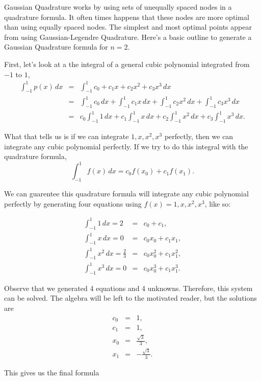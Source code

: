 \documentclass[12pt]{article}
\newcommand{\newLine}{\vspace{5mm}}
\newcommand{\integral}[3]{\text{$\int^{#2}_{#1} #3\,dx$}}
\begin{document}
\newLine Gaussian Quadrature works by using sets of unequally spaced nodes in a quadrature formula. It often times happens that these nodes are more optimal than using equally spaced nodes. The simplest and most optimal points appear from using Gaussian-Legendre Quadrature. Here's a basic outline to generate a Gaussian Quadrature formula for $n=2$.

First, let's look at a the integral of a general cubic polynomial integrated from $-1$ to $1$,
\begin{eqnarray*} \integral{-1}{1}{p(x)} &=& \integral{-1}{1}{c_0 + c_1x + c_2x^2 + c_3x^3} \\
&=& \integral{-1}{1}{c_0} + \integral{-1}{1}{c_1x} + \integral{-1}{1}{c_2x^2} + \integral{-1}{1}{c_3x^3} \\
&=& c_0\integral{-1}{1}{1} + c_1\integral{-1}{1}{x} + c_2\integral{-1}{1}{x^2} + c_3\integral{-1}{1}{x^3}.
\end{eqnarray*}

What that tells us is if we can integrate $1,x,x^2,x^3$ perfectly, then we can integrate any cubic polynomial perfectly. If we try to do this integral with the quadrature formula,
\begin{equation*} \integral{-1}{1}{f(x)} = c_0f(x_0) + c_1f(x_1). \end{equation*}

We can guarentee this quadrature formula will integrate any cubic polynomial perfectly by generating four equations using $f(x)=1,x,x^2,x^3$, like so:

\begin{eqnarray*} \integral{-1}{1}{1} = 2 &=& c_0 + c_1, \\
\integral{-1}{1}{x} = 0 &=& c_0x_0 + c_1x_1, \\
\integral{-1}{1}{x^2} = \frac{2}{3} &=& c_0x_0^2 + c_1x_1^2, \\
\integral{-1}{1}{x^3} = 0 &=& c_0x_0^3 + c_1x_1^3.
\end{eqnarray*}

Observe that we generated 4 equations and 4 unknowns. Therefore, this system can be solved. The algebra will be left to the motivated reader, but the solutions are 
\begin{eqnarray*} c_0 &=& 1, \\
c_1 &=& 1, \\
x_0 &=& \frac{\sqrt{3}}{3}, \\
x_1 &=& -\frac{\sqrt{3}}{3}.
\end{eqnarray*}

This gives us the final formula
\end{document}

